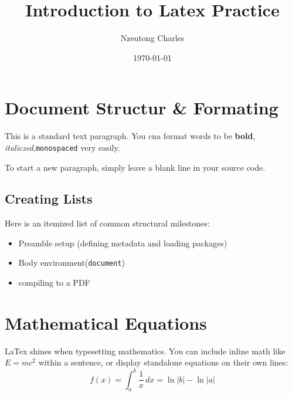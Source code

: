 \documentclass{article}
\title{Introduction to Latex Practice}
\author{Nzeutong Charles}
\date{\today}
\begin{document}
\maketitle
\section{Document Structur & Formating}
This is a standard text paragraph. You cna format words to be \textbf{bold}, \emph{italiczed},\texttt{monospaced} very easily.

To start a new paragraph, simply leave a blank line in your source code.
\subsection{Creating Lists}
Here is an itemized list of common structural milestones:
\begin{itemize}
    \item Preamble setup (defining metadata and loading packages)
    \item Body environment(\texttt{document})
    \item compiling to a PDF
\end{itemize}
\section{Mathematical Equations}
LaTex shines when typesetting mathematics. You can include inline math like $E=mc^2$ within a sentence, or display standalone equations on their own lines:
\begin{equation}
    f(x) = \int_{a}^{b}\frac{1}{x}\, dx=\ln|b|-\ln|a|
\end{equation}
\end{document}
